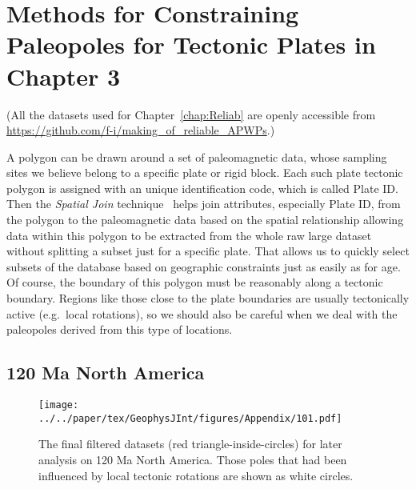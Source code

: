 \chapter{Methods for Constraining Paleopoles for Tectonic Plates in Chapter 3}\label{appen4chp3}

(All the datasets used for Chapter~\ref{chap:Reliab} are openly accessible from
\url{https://github.com/f-i/making\_of\_reliable\_APWPs}.)

A polygon can be drawn around a set of paleomagnetic data, whose sampling sites
we believe belong to a specific plate or rigid block. Each such plate tectonic
polygon is assigned with an unique identification code, which is called Plate
ID\@. Then the {\em Spatial Join\/} technique~\citep{J07} helps join attributes,
especially Plate ID, from the polygon to the paleomagnetic data based on the
spatial relationship allowing data within this polygon to be extracted from the
whole raw large dataset without splitting a subset just for a specific plate.
That allows us to quickly select subsets of the database based on geographic
constraints just as easily as for age. Of course, the boundary of this polygon
must be reasonably along a tectonic boundary. Regions like those close to the
plate boundaries are usually tectonically active (e.g.\ local rotations), so we
should also be careful when we deal with the paleopoles derived from this type
of locations.

\section{120 Ma North America}

\begin{figure}[!ht]
\texttt{[image: ../../paper/tex/GeophysJInt/figures/Appendix/101.pdf]}
  \caption[Final filtered datasets for analysis on 120 Ma North
America]{The final filtered datasets (red triangle-inside-circles) for later
analysis on 120 Ma North America. Those poles that had been
influenced by local tectonic rotations are shown as white
circles.}\label{fig_NAfinal}
\end{figure}

